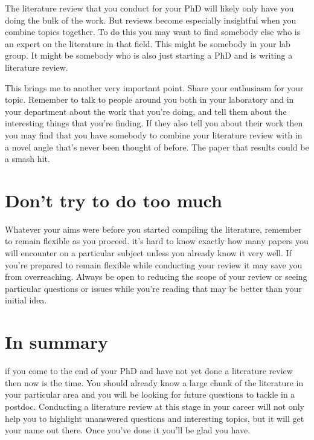 \documentclass[
]{krantz}
\begin{document}
The literature review that you conduct for your PhD will likely only have you doing the bulk of the work. But reviews become especially insightful when you combine topics together. To do this you may want to find somebody else who is an expert on the literature in that field. This might be somebody in your lab group. It might be somebody who is also just starting a PhD and is writing a literature review.

This brings me to another very important point. Share your enthusiasm for your topic. Remember to talk to people around you both in your laboratory and in your department about the work that you're doing, and tell them about the interesting things that you're finding. If they also tell you about their work then you may find that you have somebody to combine your literature review with in a novel angle that's never been thought of before. The paper that results could be a smash hit.

\hypertarget{dont-try-to-do-too-much}{%
\section{Don't try to do too much}\label{dont-try-to-do-too-much}}

Whatever your aims were before you started compiling the literature, remember to remain flexible as you proceed. it's hard to know exactly how many papers you will encounter on a particular subject unless you already know it very well. If you're prepared to remain flexible while conducting your review it may save you from overreaching. Always be open to reducing the scope of your review or seeing particular questions or issues while you're reading that may be better than your initial idea.

\hypertarget{in-summary}{%
\section{In summary}\label{in-summary}}

if you come to the end of your PhD and have not yet done a literature review then now is the time. You should already know a large chunk of the literature in your particular area and you will be looking for future questions to tackle in a postdoc. Conducting a literature review at this stage in your career will not only help you to highlight unanswered questions and interesting topics, but it will get your name out there. Once you've done it you'll be glad you have.
\end{document}
